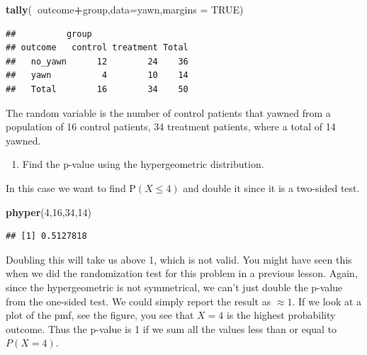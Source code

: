 \documentclass[
]{book}
\newenvironment{Shaded}{\begin{snugshade}}{\end{snugshade}}
\newcommand{\DataTypeTok}[1]{\textcolor[rgb]{0.13,0.29,0.53}{#1}}
\newcommand{\DecValTok}[1]{\textcolor[rgb]{0.00,0.00,0.81}{#1}}
\newcommand{\KeywordTok}[1]{\textcolor[rgb]{0.13,0.29,0.53}{\textbf{#1}}}
\newcommand{\NormalTok}[1]{#1}
\newcommand{\OperatorTok}[1]{\textcolor[rgb]{0.81,0.36,0.00}{\textbf{#1}}}
\newcommand{\OtherTok}[1]{\textcolor[rgb]{0.56,0.35,0.01}{#1}}
\providecommand{\tightlist}{%
  \setlength{\itemsep}{0pt}\setlength{\parskip}{0pt}}
\begin{document}
\begin{Shaded}
\begin{Highlighting}[]
\KeywordTok{tally}\NormalTok{(}\OperatorTok{~}\NormalTok{outcome}\OperatorTok{+}\NormalTok{group,}\DataTypeTok{data=}\NormalTok{yawn,}\DataTypeTok{margins =} \OtherTok{TRUE}\NormalTok{)}
\end{Highlighting}
\end{Shaded}

\begin{verbatim}
##          group
## outcome   control treatment Total
##   no_yawn      12        24    36
##   yawn          4        10    14
##   Total        16        34    50
\end{verbatim}

The random variable is the number of control patients that yawned from a population of 16 control patients, 34 treatment patients, where a total of 14 yawned.

\begin{enumerate}
\def\labelenumi{\alph{enumi}.}
\setcounter{enumi}{2}
\tightlist
\item
  Find the p-value using the hypergeometric distribution.
\end{enumerate}

In this case we want to find \(\mbox{P}(X \leq 4)\) and double it since it is a two-sided test.

\begin{Shaded}
\begin{Highlighting}[]
\KeywordTok{phyper}\NormalTok{(}\DecValTok{4}\NormalTok{,}\DecValTok{16}\NormalTok{,}\DecValTok{34}\NormalTok{,}\DecValTok{14}\NormalTok{)}
\end{Highlighting}
\end{Shaded}

\begin{verbatim}
## [1] 0.5127818
\end{verbatim}

Doubling this will take us above 1, which is not valid. You might have seen this when we did the randomization test for this problem in a previous lesson. Again, since the hypergeometric is not symmetrical, we can't just double the p-value from the one-sided test. We could simply report the result as \(\approx 1\). If we look at a plot of the pmf, see the figure, you see that \(X=4\) is the highest probability outcome. Thus the p-value is 1 if we sum all the values less than or equal to \(P(X=4)\).
\end{document}

